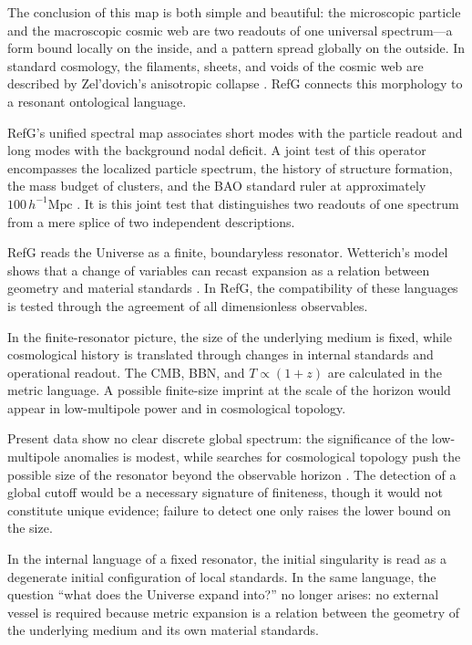 \documentclass[11pt,a4paper]{article}
\begin{document}
The conclusion of this map is both simple and beautiful: the microscopic particle and the macroscopic cosmic web are two readouts of one universal spectrum---a form bound locally on the inside, and a pattern spread globally on the outside. In standard cosmology, the filaments, sheets, and voids of the cosmic web are described by Zel'dovich's anisotropic collapse \citep{zeldovich1970}. RefG connects this morphology to a resonant ontological language.

RefG's unified spectral map associates short modes with the particle readout and long modes with the background nodal deficit. A joint test of this operator encompasses the localized particle spectrum, the history of structure formation, the mass budget of clusters, and the BAO standard ruler at approximately $100\,h^{-1}\mathrm{Mpc}$ \citep{eisenstein2005}. It is this joint test that distinguishes two readouts of one spectrum from a mere splice of two independent descriptions.

RefG reads the Universe as a finite, boundaryless resonator. Wetterich's model shows that a change of variables can recast expansion as a relation between geometry and material standards \citep{wetterich2013}. In RefG, the compatibility of these languages is tested through the agreement of all dimensionless observables.

In the finite-resonator picture, the size of the underlying medium is fixed, while cosmological history is translated through changes in internal standards and operational readout. The CMB, BBN, and $T\propto(1+z)$ are calculated in the metric language. A possible finite-size imprint at the scale of the horizon would appear in low-multipole power and in cosmological topology.

Present data show no clear discrete global spectrum: the significance of the low-multipole anomalies is modest, while searches for cosmological topology push the possible size of the resonator beyond the observable horizon \citep{planck2016}. The detection of a global cutoff would be a necessary signature of finiteness, though it would not constitute unique evidence; failure to detect one only raises the lower bound on the size.

In the internal language of a fixed resonator, the initial singularity is read as a degenerate initial configuration of local standards. In the same language, the question ``what does the Universe expand into?'' no longer arises: no external vessel is required because metric expansion is a relation between the geometry of the underlying medium and its own material standards.
\end{document}
